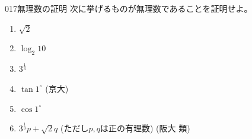 \begin{prob}{017}{}{無理数の証明}
 次に挙げるものが無理数であることを証明せよ。
 \begin{enumerate}
  \item $\sqrt{2}$ 
  \item $\log_2 10$  
  \item $3^{\frac{1}{3}}$ 
  \item $\tan 1^\circ$  (京大)
  \item $\cos 1^\circ$ 
  \item $3^{\frac{1}{3}}p+\sqrt{2}q$ (ただし$p, q$は正の有理数)  (阪大 類)
 \end{enumerate}
\end{prob}


